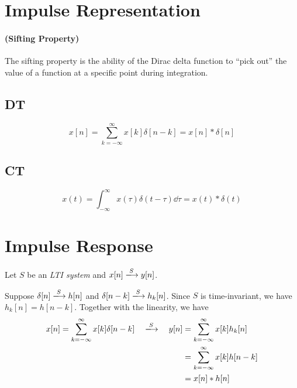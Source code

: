 \documentclass[10pt,UTF8]{article}
\newenvironment{definition box}
{\begin{tcolorbox}[colback=blue!5!white,colframe=blue!75!black,parbox=false,before upper=\par,before lower=\par]}
{\end{tcolorbox}}
\newenvironment{theorem box}
{\begin{tcolorbox}[colback=yellow!5!white,colframe=yellow!75!black,parbox=false,before upper=\par,before lower=\par]}
{\end{tcolorbox}}
\theoremstyle{definition}
\newtheorem{definition inner}{Definition}[section]
\theoremstyle{plain}
\newtheorem{theorem inner}{Theorem}[section]
\theoremstyle{definition}
\newtheorem*{proof inner}{\textit{Proof}}
\theoremstyle{remark}
\begin{document}
\section{Impulse Representation}

\paragraph*{(Sifting Property)}

The sifting property is the ability of the Dirac delta function to ``pick out'' the value of a function at a specific point during integration.

\noindent
\begin{minipage}[t]{.5\textwidth}
    \subsection{DT}
    \begin{equation*}
        x[n] = \sum_{k=-\infty}^{\infty} x[k] \delta[n-k]
        = x[n] \ast \delta[n]
    \end{equation*}
\end{minipage}\hfill
\begin{minipage}[t]{.5\textwidth}
    \subsection{CT}
    \begin{equation*}
        x(t) = \int_{-\infty}^{\infty} x(\tau) \delta(t-\tau) \dd{\tau}
        = x(t) \ast \delta(t)
    \end{equation*}
\end{minipage}

\section{Impulse Response}

Let $S$ be an \emph{LTI system} and $x[n] \xlongrightarrow{S} y[n]$.

Suppose $\delta[n] \xlongrightarrow{S} h[n]$ and $\delta[n-k]\xlongrightarrow{S} h_k[n]$.
Since $S$ is time-invariant, we have $h_k[n] = h[n-k]$.
Together with the linearity, we have
\begin{align*}
    x[n] = \sum_{k=-\infty}^{\infty} x[k] \delta[n-k]
    \quad\xlongrightarrow{S}\quad y[n] &=
    \sum_{k=-\infty}^{\infty} x[k] h_k[n] \\
    &= \sum_{k=-\infty}^{\infty} x[k] h[n-k] \\
    &= x[n] \ast h[n]
\end{align*}
\end{document}
